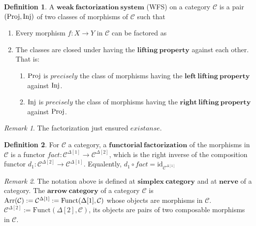 \documentclass[a4paper]{article}
\theoremstyle{plain}
\theoremstyle{definition}
\newtheorem{defn}{Definition}[section]
\theoremstyle{remark}
\newtheorem*{rem}{Remark}
\newcommand{\mc}[1]{\mathcal{#1}}
\newcommand{\mbf}[1]{\mathbf{#1}}
\newcommand{\mcC}{\mc C}
\newcommand{\id}{\mathrm{id}}
\newcommand{\Fct}{\mathrm{Funct}}
\DeclareMathOperator{\Proj}{\rm{Proj}}
\DeclareMathOperator{\Inj}{\rm{Inj}}
\DeclareMathOperator{\Arr}{\rm{Arr}}
\begin{document}
    \begin{defn}
        A $\mbf{weak\ factorization\ system}$ (WFS) on a category $\mcC$ is
        a pair $(\Proj, \Inj)$ of two classes of morphisms of $\mcC$ such that

        \begin{enumerate}
            \item Every morphism $f : X \to Y$ in $\mcC$ can be factored as
            \item The classes are closed under having the $\mbf{lifting\ property}$ against each other.
            That is:
            \begin{enumerate}
                \item $\Proj$ is $precisely$ the class of morphisms having the $\mbf{left\ lifting\ property}$ against $\Inj$.
                \item $\Inj$ is $precisely$ the class of morphisms having the $\mbf{right\ lifting\ property}$ against $\Proj$.
            \end{enumerate}
        \end{enumerate}

    \end{defn}

    \begin{rem}
        The factorization just ensured $existanse$.
    \end{rem}

    \begin{defn}
        For $\mcC$ a category, a $\mbf{functorial\ factorization}$ of the morphisms in $\mcC$ is a functor
        $ fact : \mcC^{\Delta[1]} \to \mcC^{\Delta[2]} $, which is the right inverse of
        the composition functor $d_1 : \mcC^{\Delta[2]} \to \mcC^{\Delta[1]} $. Equalently,
        $ d_1 \circ fact = \id_{\mcC^{\Delta[1]}} $
    \end{defn}
    
    \begin{rem}
        The notation above is defined at $\mbf{simplex\ category}$ and at $\mbf{nerve}$ of a category.
        The $\mbf{arrow\ category}$ of a category $\mcC$ is
        $\Arr(\mcC) := \mcC^{\Delta[1]} := \Fct(\Delta[1], \mcC)$ whose objects are morphisms in $\mcC$.
        $\mcC^{\Delta[2]} := \Fct(\Delta[2], \mcC)$, its objects are pairs of two composable morphisms in $\mcC$.
    \end{rem}
\end{document}
